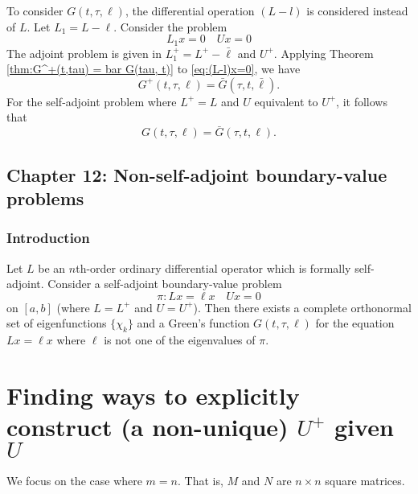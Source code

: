 \documentclass[11pt, oneside, a4paper]{article}
\begin{document}
\begin{rmk}
    To consider $G(t,\tau,\ell)$, the differential operation $(L-l)$ is considered instead of $L$. Let $L_1=L-\ell$. Consider the problem
    \begin{equation}\label{eq:(L-l)x=0}
        L_1x=0\quad Ux=0
    \end{equation}
    The adjoint problem is given in $L_1^+=L^+-\bar{\ell}$ and $U^+$. Applying Theorem \ref{thm:G^+(t,tau) = bar G(tau, t)} to \ref{eq:(L-l)x=0}, we have
    \[G^+(t,\tau,\ell) = \bar{G}(\tau,t,\bar{\ell}).\]
    For the self-adjoint problem where $L^+=L$ and $U$ equivalent to $U^+$, it follows that 
    \[G(t,\tau,\ell) = \bar{G}(\tau,t,\ell).\]
\end{rmk}

\newpage
\subsection{Chapter 12: Non-self-adjoint boundary-value problems}
\subsubsection{Introduction}
Let $L$ be an $n$th-order ordinary differential operator which is formally self-adjoint. Consider a self-adjoint boundary-value problem
\[\pi: Lx=\ell x\quad Ux=0\]
on $[a,b]$ {(\color{blue}where $L=L^+$ and $U=U^+$)}. Then there exists a complete orthonormal set of eigenfunctions $\{\chi_k\}$ and a Green's function $G(t,\tau,\ell)$ for the equation $Lx=\ell x$ where $\ell$ is not one of the eigenvalues of $\pi$.


\newpage
\section{Finding ways to explicitly construct (a non-unique) $U^+$ given $U$}
We focus on the case where $m=n$. That is, $M$ and $N$ are $n\times n$ square matrices.
\end{document}
